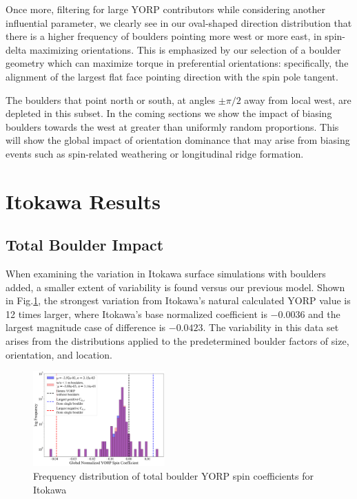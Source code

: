 Once more, filtering for large YORP contributors while considering another influential parameter, we clearly see in our oval-shaped direction distribution that there is a higher frequency of boulders pointing more west or more east, in spin-delta maximizing orientations. This is emphasized by our selection of a boulder geometry which can maximize torque in preferential orientations: specifically, the alignment of the largest flat face pointing direction with the spin pole tangent.

The boulders that point north or south, at angles $\pm \pi/2$ away from local west, are depleted in this subset. In the coming sections we show the impact of biasing boulders towards the west at greater than uniformly random proportions. This will show the global impact of orientation dominance that may arise from biasing events such as spin-related weathering or longitudinal ridge formation. 


\section{Itokawa Results}\label{itokawa}

\subsection{Total Boulder Impact}
When examining the variation in Itokawa surface simulations with boulders added, a smaller extent of variability is found versus our previous model. Shown in Fig.\ref{fig:itokawa_all_cases}, the strongest variation from Itokawa's natural calculated YORP value is 12 times larger, where Itokawa's base normalized coefficient is $-0.0036$ and the largest magnitude case of difference is $-0.0423$. The variability in this data set arises from the distributions applied to the predetermined boulder factors of size, orientation, and location. 
\begin{figure}[H]
    \centering
    \includegraphics[width=0.45\textwidth]{fig/itokawa_comparison.png}
    \caption{Frequency distribution of total boulder YORP spin coefficients for Itokawa}
    \label{fig:itokawa_all_cases}
\end{figure}

